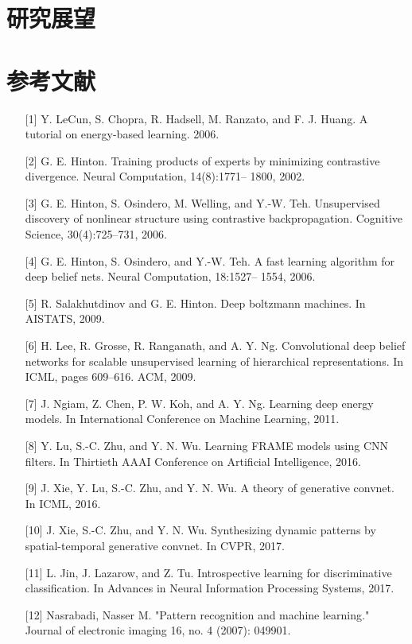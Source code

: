 \section{研究展望} 

\section{参考文献}

\begin{itemize}
\item [{[}1{]}] Y. LeCun, S. Chopra, R. Hadsell, M. Ranzato, and F. J. Huang. A tutorial on energy-based learning. 2006.
\item [{[}2{]}] G. E. Hinton. Training products of experts by minimizing contrastive divergence. Neural Computation, 14(8):1771– 1800, 2002.
\item [{[}3{]}] G. E. Hinton, S. Osindero, M. Welling, and Y.-W. Teh. Unsupervised discovery of nonlinear structure using contrastive backpropagation. Cognitive Science, 30(4):725–731, 2006.
\item [{[}4{]}] G. E. Hinton, S. Osindero, and Y.-W. Teh. A fast learning algorithm for deep belief nets. Neural Computation, 18:1527– 1554, 2006.
\item [{[}5{]}] R. Salakhutdinov and G. E. Hinton. Deep boltzmann machines. In AISTATS, 2009.
\item [{[}6{]}] H. Lee, R. Grosse, R. Ranganath, and A. Y. Ng. Convolutional deep belief networks for scalable unsupervised learning of hierarchical representations. In ICML, pages 609–616. ACM, 2009.
\item [{[}7{]}] J. Ngiam, Z. Chen, P. W. Koh, and A. Y. Ng. Learning deep energy models. In International Conference on Machine Learning, 2011.
\item [{[}8{]}] Y. Lu, S.-C. Zhu, and Y. N. Wu. Learning FRAME models using CNN filters. In Thirtieth AAAI Conference on Artificial Intelligence, 2016.
\item [{[}9{]}] J. Xie, Y. Lu, S.-C. Zhu, and Y. N. Wu. A theory of generative convnet. In ICML, 2016.
\item [{[}10{]}] J. Xie, S.-C. Zhu, and Y. N. Wu. Synthesizing dynamic patterns by spatial-temporal generative convnet. In CVPR, 2017.
\item [{[}11{]}] L. Jin, J. Lazarow, and Z. Tu. Introspective learning for discriminative classification. In Advances in Neural Information Processing Systems, 2017.
\item [{[}12{]}] Nasrabadi, Nasser M. "Pattern recognition and machine learning." Journal of electronic imaging 16, no. 4 (2007): 049901.

\end{itemize}
